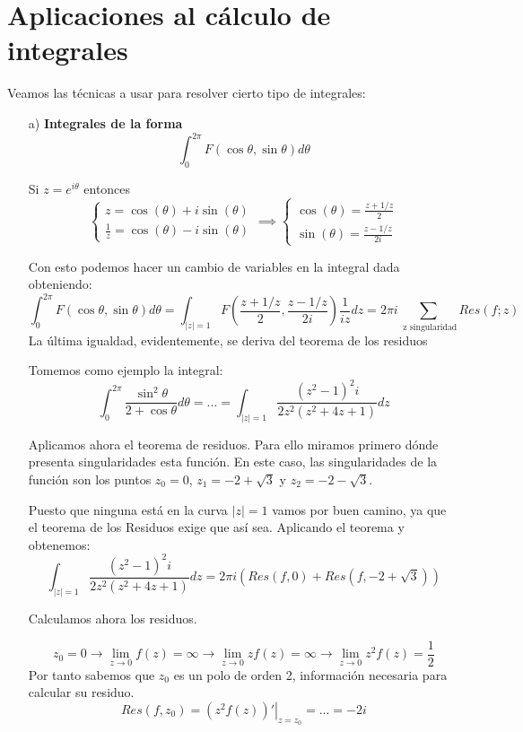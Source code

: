 \documentclass{apuntes}
\begin{document}
\section{Aplicaciones al cálculo de integrales}
Veamos las técnicas a usar para resolver cierto tipo de integrales:
\begin{enumerate}
\item[a)] \textbf{Integrales de la forma}
\[\int_0^{2π}F(\cos \theta, \sin \theta) d \theta\]

Si $z=e^{i\theta}$ entonces
\[\left\{ \begin{aligned}z=\cos(\theta)+i\sin(\theta)\\
\frac{1}{z}=\cos(\theta)-i\sin(\theta) \end{aligned} \right. \implies \left\{\begin{aligned} \cos(\theta)=\frac{z+1/z}{2}\\ \sin(\theta)=\frac{z-1/z}{2i} \end{aligned} \right.\]

Con esto podemos hacer un cambio de variables en la integral dada obteniendo:
\[\int_0^{2π}F(\cos \theta, \sin \theta) d \theta = \int_{|z|=1} F\left( \frac{z+1/z}{2}, \frac{z-1/z}{2i}  \right)\frac{1}{iz}dz = 2πi\sum_{\text{ z singularidad}} Res(f;z)\]
La última igualdad, evidentemente, se deriva del teorema de los residuos

\begin{example}
Tomemos como ejemplo la integral:
\[\int_0^{2π} \frac{\sin^2 \theta}{2+\cos \theta}d\theta = ... = \int_{|z|=1}\frac{(z^2-1)^2i}{2z^2(z^2+4z+1)}dz\]

Aplicamos ahora el teorema de residuos. Para ello miramos primero dónde presenta singularidades esta función. En este caso, las singularidades de la función son los puntos $z_0=0$, $z_1=-2+\sqrt{3}$ y $z_2=-2-\sqrt{3}$.

Puesto que ninguna está en la curva $|z|=1$ vamos por buen camino, ya que el teorema de los Residuos exige que así sea. Aplicando el teorema y obtenemos:
\[\int_{|z|=1}\frac{(z^2-1)^2i}{2z^2(z^2+4z+1)}dz = 2πi\left(Res(f,0)+Res(f,-2+\sqrt{3})\right)\]

Calculamos ahora los residuos.

\[z_0=0 \to \lim_{z \to 0} f(z) = \infty \to \lim_{z \to 0} zf(z) = \infty \to \lim_{z \to 0} z^2f(z)=\frac{1}{2}\]
Por tanto sabemos que $z_0$ es un polo de orden 2, información necesaria para calcular su residuo.
\[Res(f,z_0)=\left.(z^2f(z))'\right|_{z=z_0} = ... = -2i\]


\end{example}
\end{enumerate}
\end{document}
